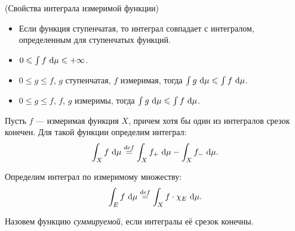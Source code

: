 \begin{theorem}(Свойства интеграла измеримой функции)
	\enewline

	\begin{itemize}
		\item Если функция ступенчатая, то интеграл совпадает с интегралом, определенным
			для ступенчатых функций.
		\item $0 \leqslant \int{f ~\mathrm{d}\mu} \leqslant +\infty$.
		\item $0 \leqslant g \leqslant f$, $g$ ступенчатая, $f$ измеримая, тогда
			$\int{g ~\mathrm{d}\mu} \leqslant \int{f ~\mathrm{d}\mu}$.
		\item $0 \leqslant g \leqslant f$, $f$, $g$ измеримы, тогда $\int{g ~\mathrm{d}\mu} \leqslant 
            \int{f ~\mathrm{d}\mu}$.
	\end{itemize}
\end{theorem}

\begin{definition}
	Пусть $f$ --- измеримая функция $X$, причем хотя бы один из интегралов срезок конечен.
	Для такой функции определим интеграл:
\[
	\int_X{f ~\mathrm{d}\mu} \overset{def}{\underset{}{=}} \int_X{f_+ ~\mathrm{d}\mu} - \int_X{f_- ~\mathrm{d}\mu}
.\]
\end{definition}

\begin{definition}
	Определим интеграл по измеримому множеству:
\[
	\int_E{f ~\mathrm{d}\mu} \overset{def}{\underset{}{=}} \int_X{f \cdot \chi_{E} ~\mathrm{d}\mu}
.\]
\end{definition}

\begin{definition}
	Назовем функцию \textit{суммируемой}, если интегралы её срезок конечны.
\end{definition}

